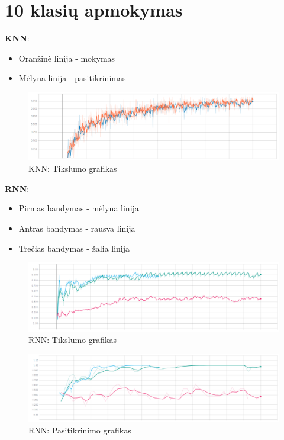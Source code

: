 \documentclass{VUMIFPSbakalaurinis}
\begin{document}
\section{10 klasių apmokymas}
\label{appendix:10kl}

\textbf{KNN}:
\begin{itemize}
	\item Oranžinė linija - mokymas
	\item Mėlyna linija - pasitikrinimas
\end{itemize}

\begin{figure}[H]
	\centering
	\includegraphics[scale=0.3]{img/2/knn-acc}
	\caption{KNN: Tikslumo grafikas}
	\label{img:10knn-acc}
\end{figure}


\textbf{RNN}:
\begin{itemize}
	\item Pirmas bandymas - mėlyna linija
	\item Antras bandymas - rausva linija
	\item Trečias bandymas - žalia linija
\end{itemize}

\begin{figure}[H]
	\centering
	\includegraphics[scale=0.3]{img/2/acc}
	\caption{RNN: Tikslumo grafikas}
	\label{img:10acc}
\end{figure}

\begin{figure}[H]
	\centering
	\includegraphics[scale=0.3]{img/2/val}
	\caption{RNN: Pasitikrinimo grafikas}
	\label{img:10val}
\end{figure}
\end{document}
